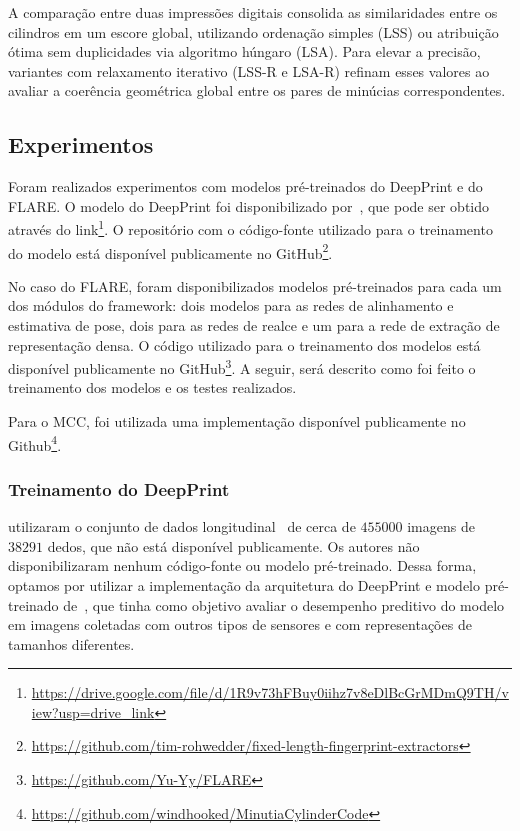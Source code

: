 A comparação entre duas impressões digitais consolida as similaridades entre os cilindros em um escore global, utilizando ordenação simples (LSS) ou atribuição ótima sem duplicidades via algoritmo húngaro (LSA). Para elevar a precisão, variantes com relaxamento iterativo (LSS-R e LSA-R) refinam esses valores ao avaliar a coerência geométrica global entre os pares de minúcias correspondentes.


\subsection{Experimentos}\label{subsec:experimentos}

Foram realizados experimentos com modelos pré-treinados do DeepPrint e do FLARE. O modelo do DeepPrint foi disponibilizado por~, que pode ser obtido através do link\footnote{\url{https://drive.google.com/file/d/1R9v73hFBuy0iihz7v8eDlBcGrMDmQ9TH/view?usp=drive_link}}. O repositório com o código-fonte utilizado para o treinamento do modelo está disponível publicamente no GitHub\footnote{\url{https://github.com/tim-rohwedder/fixed-length-fingerprint-extractors}}. 

No caso do FLARE, foram disponibilizados modelos pré-treinados para cada um dos módulos do framework: dois modelos para as redes de alinhamento e estimativa de pose, dois para as redes de realce e um para a rede de extração de representação densa. O código utilizado para o treinamento dos modelos está disponível publicamente no GitHub\footnote{\url{https://github.com/Yu-Yy/FLARE}}. A seguir, será descrito como foi feito o treinamento dos modelos e os testes realizados.

Para o MCC, foi utilizada uma implementação disponível publicamente no Github\footnote{\url{https://github.com/windhooked/MinutiaCylinderCode}}.


\subsubsection{Treinamento do DeepPrint}\label{subsubsec:deepprint-training}

 utilizaram o conjunto de dados longitudinal~\cite{longitudinal} de cerca de $455000$ imagens de $38291$ dedos, que não está disponível publicamente. Os autores não disponibilizaram nenhum código-fonte ou modelo pré-treinado. Dessa forma, optamos por utilizar a implementação da arquitetura do DeepPrint e modelo pré-treinado de~, que tinha como objetivo avaliar o desempenho preditivo do modelo em imagens coletadas com outros tipos de sensores e com representações de tamanhos diferentes.

